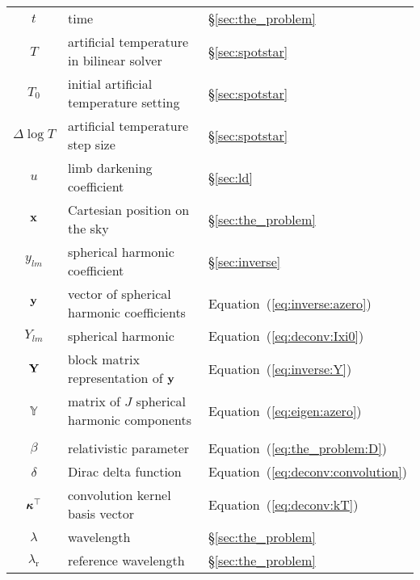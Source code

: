 \documentclass[modern]{aastex62}
\begin{document}
\begin{center}
\begin{longtable}{cll}
    $t$                      & time                                                  & \S\ref{sec:the_problem}\\
    $T$                      & artificial temperature in bilinear solver             & \S\ref{sec:spotstar}\\
    $T_0$                    & initial artificial temperature setting                & \S\ref{sec:spotstar}\\
    $\Delta\log T$           & artificial temperature step size                      & \S\ref{sec:spotstar}\\
    $u$                      & limb darkening coefficient                            & \S\ref{sec:ld}\\
    ${\mathbf{x}}$                     & Cartesian position on the sky                         & \S\ref{sec:the_problem}\\
    $y_{lm}$                 & spherical harmonic coefficient                        & \S\ref{sec:inverse}\\
    ${\mathbf{y}}$               & vector of spherical harmonic coefficients             & Equation~(\ref{eq:inverse:azero})\\
    $Y_{lm}$                 & spherical harmonic                                    & Equation~(\ref{eq:deconv:Ixi0})\\
    ${\mathbf{Y}}$               & block matrix representation of ${\mathbf{y}}$             & Equation~(\ref{eq:inverse:Y})\\
    $\boldsymbol{\mathbb{Y}}$& matrix of $J$ spherical harmonic components           & Equation~(\ref{eq:eigen:azero})\\
    \pagebreak
    \midrule
    \multicolumn{3}{c}{\emph{Variables (Greek)}}\\
    \midrule
    $\beta$                  & relativistic parameter                                & Equation~(\ref{eq:the_problem:D})\\
    $\delta$                 & Dirac delta function                                  & Equation~(\ref{eq:deconv:convolution})\\
    $\boldsymbol{\kappa}^\top$                    & convolution kernel basis vector                       & Equation~(\ref{eq:deconv:kT})\\
    $\lambda$                & wavelength                                            & \S\ref{sec:the_problem}\\
    $\lambda_\mathrm{r}$     & reference wavelength                                  & \S\ref{sec:the_problem}\\

\end{longtable}
\end{center}
\end{document}
